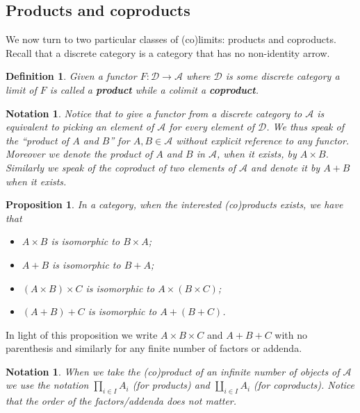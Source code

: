 \documentclass[letterpaper, 11pt, oneside]{memoir}
\theoremstyle{myteo}
\newtheorem{proposition}[theorem]{Proposition}
\newtheorem{definition}[theorem]{Definition}
\newtheorem{notation}[theorem]{Notation}
\numberwithin{equation}{section}
\newcommand{\marginnote}[1]{\marginpar{\footnotesize #1}}
\newcommand{\A}{\mathscr{A}}
\begin{document}
\subsection{Products and coproducts}

We now turn to two particular classes of (co)limits: products and coproducts.
Recall that a discrete category is a category that has no non-identity arrow.

\begin{definition}
  Given a functor \(F \colon \mathscr{D} \to \A\) where \(\mathscr{D}\) is some discrete category a limit of \(F\) is called a \textbf{product} while a colimit a \textbf{coproduct}.
  \marginnote{product, coproduct}
\end{definition}

\begin{notation}
  Notice that to give a functor from a discrete category to \(\A\) is equivalent to picking an element of \(\A\) for every element of \(\mathscr{D}\).
  We thus speak of the ``product of \(A\) and \(B\)'' for \(A, B \in \A\) without explicit reference to any functor.
  Moreover we denote the product of \(A\) and \(B\) in \(\A\), when it exists, by \(A \times B\).
  Similarly we speak of the coproduct of two elements of \(\A\) and denote it by \(A + B\) when it exists.
\end{notation}

\begin{proposition}
  In a category, when the interested (co)products exists, we have that
  \begin{itemize}
  \item[1.] \(A \times B\) is isomorphic to \(B \times A\);
  \item[2.] \(A + B\) is isomorphic to \(B + A\);
  \item[3.] \((A \times B) \times C\) is isomorphic to \(A \times (B \times C)\);
  \item[4.] \((A + B) + C\) is isomorphic to \(A + (B + C)\).
  \end{itemize}
\end{proposition}

In light of this proposition we write \(A \times B \times C\) and \(A + B + C\) with no parenthesis and similarly for any finite number of factors or addenda.

\begin{notation}
  When we take the (co)product of an infinite number of objects of \(\A\) we use the notation \(\prod_{i\in I}A_i\) (for products) and \(\coprod_{i \in I}A_i\) (for coproducts).
  Notice that the order of the factors/addenda does not matter.
\end{notation}
\end{document}
